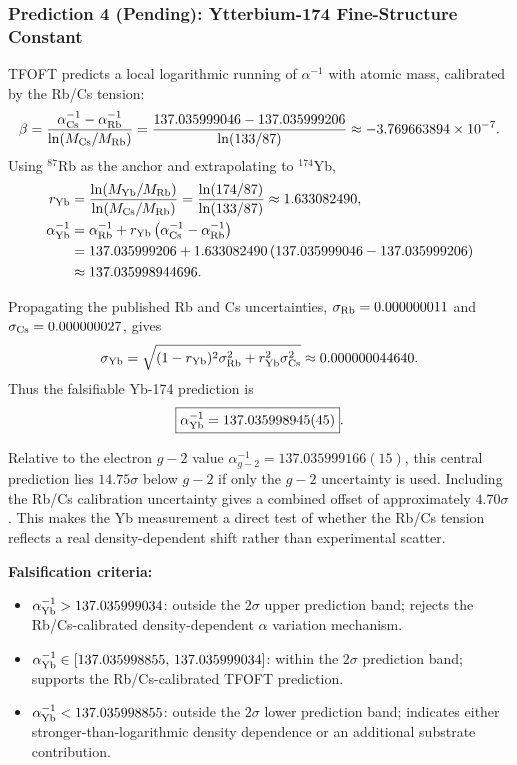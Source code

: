 \documentclass[11pt,a4paper]{article}
\begin{document}
\subsubsection{Prediction 4 (Pending): Ytterbium-174 Fine-Structure Constant}

TFOFT predicts a local logarithmic running of $\alpha^{-1}$ with atomic mass, calibrated by the Rb/Cs tension:
\begin{equation}
\beta =
\frac{\alpha^{-1}_{\rm Cs}-\alpha^{-1}_{\rm Rb}}
{\ln(M_{\rm Cs}/M_{\rm Rb})}
=
\frac{137.035999046-137.035999206}
{\ln(133/87)}
\approx -3.769663894\times10^{-7}.
\end{equation}
Using $^{87}$Rb as the anchor and extrapolating to $^{174}$Yb,
\begin{align}
r_{\rm Yb}
&=
\frac{\ln(M_{\rm Yb}/M_{\rm Rb})}
{\ln(M_{\rm Cs}/M_{\rm Rb})}
=
\frac{\ln(174/87)}{\ln(133/87)}
\approx 1.633082490, \\
\alpha^{-1}_{\rm Yb}
&=
\alpha^{-1}_{\rm Rb}
+
r_{\rm Yb}
\left(
\alpha^{-1}_{\rm Cs}-\alpha^{-1}_{\rm Rb}
\right) \\
&=
137.035999206
+
1.633082490
\left(
137.035999046-137.035999206
\right) \\
&\approx
137.035998944696.
\end{align}

Propagating the published Rb and Cs uncertainties,
$\sigma_{\rm Rb}=0.000000011$ and $\sigma_{\rm Cs}=0.000000027$, gives
\begin{equation}
\sigma_{\rm Yb}
=
\sqrt{
(1-r_{\rm Yb})^2\sigma_{\rm Rb}^2
+
r_{\rm Yb}^2\sigma_{\rm Cs}^2
}
\approx
0.000000044640.
\end{equation}
Thus the falsifiable Yb-174 prediction is
\begin{equation}
\boxed{
\alpha^{-1}_{\rm Yb}
=
137.035998945(45)
}.
\end{equation}

Relative to the electron $g-2$ value
$\alpha^{-1}_{g-2}=137.035999166(15)$, this central prediction lies
$14.75\sigma$ below $g-2$ if only the $g-2$ uncertainty is used. Including
the Rb/Cs calibration uncertainty gives a combined offset of approximately
$4.70\sigma$. This makes the Yb measurement a direct test of whether the
Rb/Cs tension reflects a real density-dependent shift rather than experimental
scatter.

\textbf{Falsification criteria:}
\begin{itemize}
  \item $\alpha^{-1}_{\rm Yb} > 137.035999034$: outside the $2\sigma$ upper prediction band; rejects the Rb/Cs-calibrated density-dependent $\alpha$ variation mechanism.
  \item $\alpha^{-1}_{\rm Yb} \in [137.035998855,\,137.035999034]$: within the $2\sigma$ prediction band; supports the Rb/Cs-calibrated TFOFT prediction.
  \item $\alpha^{-1}_{\rm Yb} < 137.035998855$: outside the $2\sigma$ lower prediction band; indicates either stronger-than-logarithmic density dependence or an additional substrate contribution.
\end{itemize}
\end{document}
